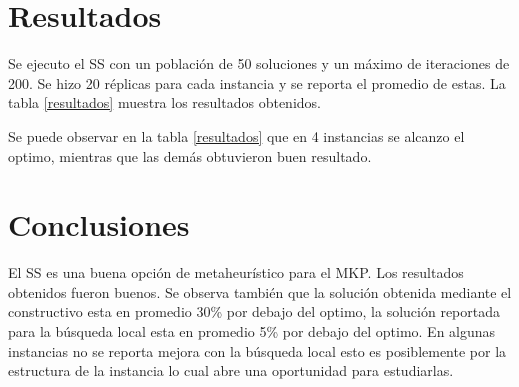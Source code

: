 \documentclass[12pt,a4paper,twocolumn]{article}
\begin{document}
\section{Resultados}

Se ejecuto el SS con un población de 50 soluciones y un máximo de iteraciones de 200. Se hizo 20 r\'eplicas para cada instancia y se reporta el promedio de estas. La tabla \ref{resultados} muestra los resultados obtenidos.

Se puede observar en la tabla \ref{resultados} que en 4 instancias se alcanzo el optimo, mientras que las demás obtuvieron buen resultado.

\section{Conclusiones}

El SS es una buena opción de metaheur\'istico para el MKP. Los resultados obtenidos fueron buenos. Se observa también que la solución obtenida mediante el constructivo esta en promedio 30\% por debajo del optimo, la solución reportada para la búsqueda local esta en promedio 5\% por debajo del optimo. En algunas instancias no se reporta mejora con la búsqueda local esto es posiblemente por la estructura de la instancia lo cual abre una oportunidad para estudiarlas.
\end{document}
